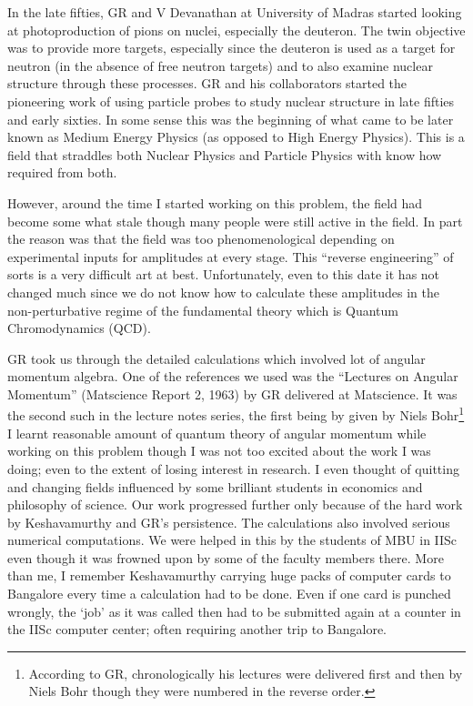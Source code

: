In the late fifties, GR and V Devanathan at University of Madras started looking at photoproduction of pions on nuclei, especially the deuteron. The twin objective was to provide more targets, especially since the deuteron is used as a target for neutron (in the absence of free neutron targets) and to also examine nuclear structure through these processes. GR and his collaborators started the pioneering work of using particle probes to study nuclear structure in late fifties and early sixties. In some sense this was the beginning of what came to be later known as Medium Energy Physics (as opposed to High Energy Physics). This is a field that straddles both Nuclear Physics and Particle Physics with know how required from both.

However, around the time I started working on this problem, the field had become some what stale though many people were still active in the field. In part the reason was that the field was too phenomenological depending on experimental inputs for amplitudes at every stage. This “reverse engineering” of sorts is a very difficult art at best. Unfortunately, even to this date it has not changed much since we do not know how to calculate these amplitudes in the non-perturbative regime of the fundamental theory which is Quantum Chromodynamics (QCD).

GR took us through the detailed calculations which involved lot of angular momentum algebra. One of the references we used was the “Lectures on Angular Momentum” (Matscience Report 2, 1963) by GR delivered at Matscience. It was the second such in the lecture notes series, the first being by given by Niels Bohr\footnote{According to GR, chronologically his lectures were delivered first and then by Niels Bohr though they were numbered in the reverse order.} I learnt reasonable amount of quantum theory of angular momentum while working on this problem though I was not too excited about the work I was doing; even to the extent of losing interest in research. I even thought of quitting and changing fields influenced by some brilliant students in economics and philosophy of science. Our work progressed further only because of the hard work by Keshavamurthy and GR’s persistence. The calculations also involved serious numerical computations. We were helped in this by the students of MBU in IISc even though it was frowned upon by some of the faculty members there. More than me, I remember Keshavamurthy carrying huge packs of computer cards to Bangalore every time a calculation had to be done. Even if one card is punched wrongly, the ‘job’ as it was called then had to be submitted again at a counter in the IISc computer center; often requiring another trip to Bangalore.

